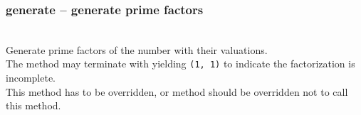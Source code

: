   \subsubsection{\negok generate -- generate prime factors}
  \\
  \spacing
  \quad Generate prime factors of the  number with their valuations.\\
 \spacing
  \quad The method may terminate with yielding {\tt (1, 1)}
  to indicate the factorization is incomplete.\\
  This method has to be overridden, or  method should be overridden not to call this method.\\
\C



